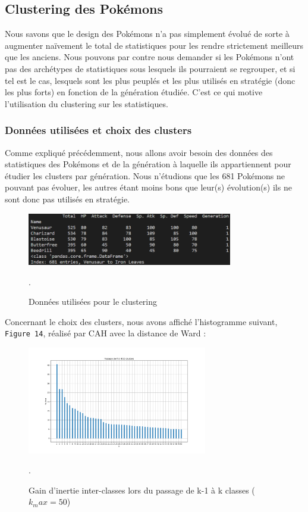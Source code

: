 \documentclass[a4paper,12pt]{article}
\begin{document}
\subsection{Clustering des Pokémons}
Nous savons que le design des Pokémons n'a pas simplement évolué de sorte à
augmenter naïvement le total de statistiques pour les rendre strictement
meilleurs que les anciens. Nous pouvons par contre nous demander si les Pokémons
n'ont pas des archétypes de statistiques sous lesquels ils pourraient se
regrouper, et si tel est le cas, lesquels sont les plus peuplés et les plus
utilisés en stratégie (donc les plus forts) en fonction de la génération
étudiée. C'est ce qui motive l'utilisation du clustering sur les statistiques.

\subsubsection{Données utilisées et choix des clusters}
Comme expliqué précédemment, nous allons avoir besoin des données des
statistiques des Pokémons et de la génération à laquelle ils appartiennent pour
étudier les clusters par génération. Nous n'étudions que les 681 Pokémons ne
pouvant pas évoluer, les autres étant moins bons que leur(s) évolution(s) ils ne sont
donc pas utilisés en stratégie.

\begin{figure}[h]
    \centering
    \includegraphics[width=0.8\textwidth]{Clustering/stats_gen_infos.png}
    \caption{Données utilisées pour le clustering}.
\end{figure}

Concernant le choix des clusters, nous avons affiché l'histogramme suivant,
\texttt{Figure 14}, réalisé par CAH avec la distance de Ward : 

\begin{figure}[h]
    \centering
    \includegraphics[width=0.7\textwidth]{Clustering/heights_k_clustering_zoomed.png}
    \caption{Gain d'inertie inter-classes lors du passage de k-1 à k classes
    ($k_max = 50$)}.
\end{figure}
\end{document}
